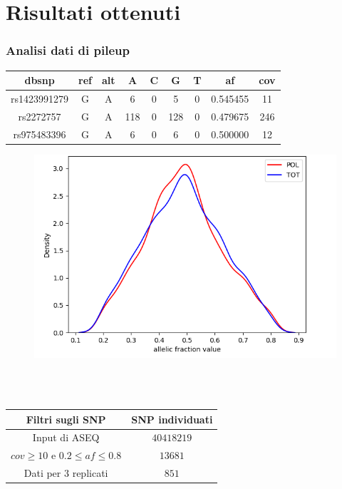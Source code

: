 \documentclass[aspectration=1610]{beamer}
\begin{document}
	\section{Risultati ottenuti}
	\begin{frame}
		\frametitle{Analisi dati di pileup}
		\begin{table}
			\begin{tiny}
			\begin{tabular}{|c|c|c|c|c|c|c|c|c|}
				\hline
				dbsnp & ref & alt & A & C & G & T & af & cov \\
				\hline
				rs1423991279 & G & A & 6 & 0 & 5 & 0 & 0.545455 & 11 \\
				\hline
				rs2272757 & G & A & 118 & 0 & 128 & 0 & 0.479675 & 246 \\
				\hline
				rs975483396 & G & A & 6 & 0 & 6 & 0 & 0.500000 & 12 \\
				\hline
			\end{tabular}
		\end{tiny}
		\end{table}
			\begin{multicols}{2}
			\begin{figure}
					\includegraphics[height=0.5\textheight]{media/distribution.png}
			\end{figure}
			\mbox{}\\
			\mbox{}\\
			\begin{table}
			\begin{tiny}
				\begin{tabular}{|c|c|}
					\hline
					Filtri sugli SNP & SNP individuati\\
					\hline
					Input di ASEQ & $40418219$\\
					\hline
					$cov \ge 10$ e $0.2\le af\le 0.8$ & $13681$\\
					\hline
					Dati per $3$ replicati & $851$\\
					\hline
				\end{tabular}
			\end{tiny}
			\end{table}
		\end{multicols}
	\end{frame}
\end{document}
